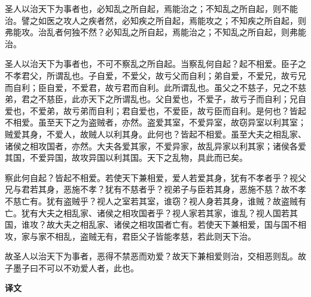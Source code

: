 \documentclass[12pt,UTF-8,openany,a4]{ctexbook}
\begin{document}
\begin{large}
    
    圣人以治天下为事者也，必知乱之所自起，焉能治之；不知乱之所自起，则不能治。譬之如医之攻人之疾者然，必知疾之所自起，焉能攻之；不知疾之所自起，则弗能攻。治乱者何独不然？必知乱之所自起，焉能治之；不知乱之所自起，则弗能治。
    
    圣人以治天下为事者也，不可不察乱之所自起。当察乱何自起？起不相爱。臣子之不孝君父，所谓乱也。子自爱，不爱父，故亏父而自利；弟自爱，不爱兄，故亏兄而自利；臣自爱，不爱君，故亏君而自利。此所谓乱也。虽父之不慈子，兄之不慈弟，君之不慈臣，此亦天下之所谓乱也。父自爱也，不爱子，故亏子而自利；兄自爱也，不爱弟，故亏弟而自利；君自爱也，不爱臣，故亏臣而自利。是何也？皆起不相爱。虽至天下之为盗贼者，亦然。盗爱其室，不爱异室，故窃异室以利其室；贼爱其身，不爱人，故贼人以利其身。此何也？皆起不相爱。虽至大夫之相乱家、诸侯之相攻国者，亦然。大夫各爱其家，不爱异家，故乱异家以利其家；诸侯各爱其国，不爱异国，故攻异国以利其国。天下之乱物，具此而已矣。
    
    察此何自起？皆起不相爱。若使天下兼相爱，爱人若爱其身，犹有不孝者乎？视父兄与君若其身，恶施不孝？犹有不慈者乎？视弟子与臣若其身，恶施不慈？故不孝不慈亡有。犹有盗贼乎？视人之室若其室，谁窃？视人身若其身，谁贼？故盗贼有亡。犹有大夫之相乱家、诸侯之相攻国者乎？视人家若其家，谁乱？视人国若其国，谁攻？故大夫之相乱家、诸侯之相攻国者亡有。若使天下兼相爱，国与国不相攻，家与家不相乱，盗贼无有，君臣父子皆能孝慈，若此则天下治。
    
    故圣人以治天下为事者，恶得不禁恶而劝爱？故天下兼相爱则治，交相恶则乱。故子墨子曰不可以不劝爱人者，此也。
\end{large}


\newpage

\begin{Large}
    \noindent\textbf{译文}
\end{Large}


\vspace{1em}
\end{document}
